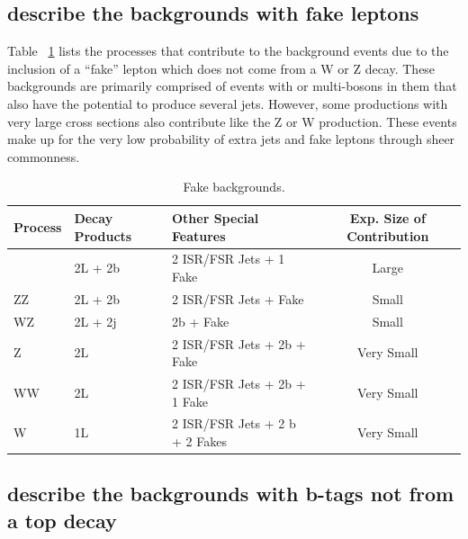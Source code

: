 			
        		\subsection{describe the backgrounds with fake leptons} 
	Table ~\ref{tab:fake_bkg} lists the processes that contribute to the background events due to the inclusion of a ``fake'' lepton which does not come from a W or Z decay. These backgrounds are primarily comprised of events with \ttbar or multi-bosons in them that also have the potential to produce several jets. However, some productions with very large cross sections also contribute like the Z or W production. These events make up for the very low probability of extra jets and fake leptons through sheer commonness.
			
	\begin{table}[hbt]
	\begin{center}
	\begin{tabular}{l|ll|c}\hline\hline %
	Process & Decay Products & Other Special Features & Exp. Size of Contribution\\
	\hline
	\ttbar & 2L + 2b & 2 ISR/FSR Jets + 1 Fake & Large\\
	ZZ & 2L + 2b & 2 ISR/FSR Jets + Fake & Small\\
	WZ & 2L + 2j & 2b + Fake & Small\\
	Z & 2L & 2 ISR/FSR Jets + 2b + Fake & Very Small\\
	WW & 2L & 2 ISR/FSR Jets + 2b + 1 Fake & Very Small\\
	W & 1L & 2 ISR/FSR Jets + 2 b + 2 Fakes & Very Small\\
	\hline \hline
	\end{tabular}
	\caption{\label{tab:fake_bkg} Fake backgrounds.}
	\end{center}
	\end{table}
			
        		\subsection{describe the backgrounds with b-tags not from a top decay} 

